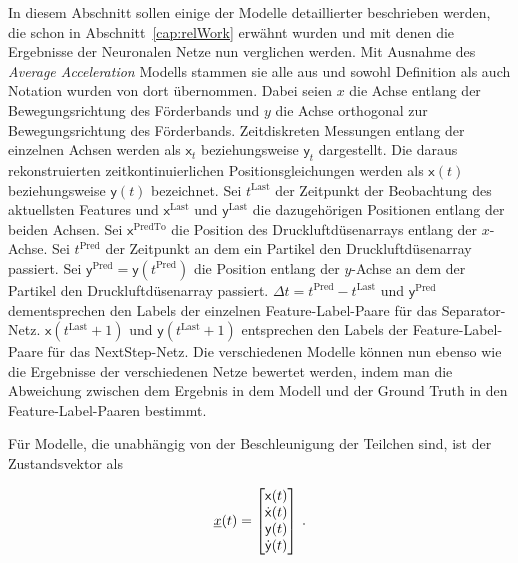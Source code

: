 \color{black}

In diesem Abschnitt sollen einige der Modelle detaillierter beschrieben werden, die schon in Abschnitt~\ref{cap:relWork} erwähnt wurden und mit denen die Ergebnisse der Neuronalen Netze nun verglichen werden.
Mit Ausnahme des \textit{Average Acceleration} Modells stammen sie alle aus \cite{Pfaff2018} und sowohl Definition als auch Notation wurden von dort übernommen.
Dabei seien \(x\) die Achse entlang der Bewegungsrichtung des Förderbands und \(y\) die Achse orthogonal zur Bewegungsrichtung des Förderbands.
Zeitdiskreten Messungen entlang der einzelnen Achsen werden als \(\mathsf{x}_t\) beziehungsweise \(\mathsf{y}_t\) dargestellt.
Die daraus rekonstruierten zeitkontinuierlichen Positionsgleichungen werden als \(\mathsf{x}(t)\) beziehungsweise \(\mathsf{y}(t)\) bezeichnet.
Sei \(t^{\text{Last}}\) der Zeitpunkt der Beobachtung des aktuellsten Features und \(\mathsf{x}^{\text{Last}}\) und \(\mathsf{y}^{\text{Last}}\) die dazugehörigen Positionen entlang der beiden Achsen.
Sei \(\mathsf{x}^{\text{PredTo}}\) die Position des Druckluftdüsenarrays entlang der \(x\)-Achse.
Sei \(t^{\text{Pred}}\) der Zeitpunkt an dem ein Partikel den Druckluftdüsenarray passiert.
Sei \(\mathsf{y}^{\text{Pred}} = \mathsf{y}(t^{\text{Pred}})\) die Position entlang der \(y\)-Achse an dem der Partikel den Druckluftdüsenarray passiert.
\(\Delta t = t^{\text{Pred}} - t^{\text{Last}} \) und \(\mathsf{y}^{\text{Pred}}\) dementsprechen den Labels der einzelnen Feature-Label-Paare für das Separator-Netz.
\(\mathsf{x}(t^{\text{Last}} + 1)\) und \(\mathsf{y}(t^{\text{Last}} + 1)\) entsprechen den Labels der Feature-Label-Paare für das NextStep-Netz.
Die verschiedenen Modelle können nun ebenso wie die Ergebnisse der verschiedenen Netze bewertet werden, 
indem man die Abweichung zwischen dem Ergebnis in dem Modell und der Ground Truth in den Feature-Label-Paaren bestimmt.


Für Modelle, die unabhängig von der Beschleunigung der Teilchen sind, ist der Zustandsvektor als 

\begin{equation} \label{eq:definitionCV}
    {\underline{x}}(t) = 
    \begin{bmatrix}
        \mathsf{x}(t) \\
        \dot{\mathsf{x}}(t) \\
        \mathsf{y}(t) \\
        \dot{\mathsf{y}}(t)
       \end{bmatrix} \: .
\end{equation}

